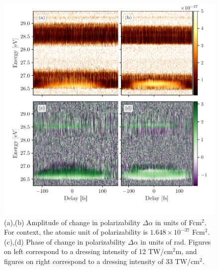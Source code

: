 \begin{figure}
	\centering
	\includegraphics[width=1.0\textwidth]{figures/CATS/amp_ph_delay.pdf}
	\caption[Polarizability amplitude and phase extracted from CATS measurement for two dressing intensities]{(a),(b) Amplitude of change in polarizability $\Delta\alpha$ in units of Fcm$^2$. For context, the atomic unit of polarizability is $1.648\times10^{-37}$ Fcm$^2$. (c),(d) Phase of change in polarizability $\Delta\alpha$ in units of rad.  Figures on left correspond to a dressing intensity of 12 TW/cm$^2$m, and figures on right correspond to a dressing intensity of 33 TW/cm$^2$.}
	\label{fig:amp_ph_delay}
\end{figure}

